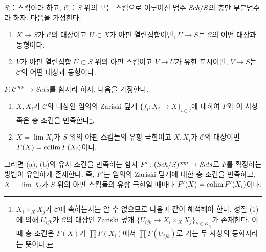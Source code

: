 \begin{lemma}
\label{lemma-extend}
$S$를 스킴이라 하고, $\mathcal{C}$를 $S$ 위의 모든 스킴으로 이루어진 범주
$\mathit{Sch}/S$의 충만 부분범주라 하자. 다음을 가정한다.
\begin{enumerate}
\item $X \to S$가 $\mathcal{C}$의 대상이고 $U \subset X$가 아핀
열린집합이면, $U \to S$는 $\mathcal{C}$의 어떤 대상과 동형이다.
\item $V$가 아핀 열린집합 $U \subset S$ 위의 아핀 스킴이고 $V \to U$가
유한 표시이면, $V \to S$는 $\mathcal{C}$의 어떤 대상과 동형이다.
\end{enumerate}
$F : \mathcal{C}^{opp} \to \textit{Sets}$를 함자라 하자. 다음을 가정한다.
\begin{enumerate}
\item[(a)] $X, X_i$가 $\mathcal{C}$의 대상인 임의의 Zariski 덮개
$\{f_i : X_i \to X\}_{i \in I}$에 대하여 $F$와 이 사상족은 층 조건을
만족한다\footnote{$X_i \times_X X_j$가 $\mathcal{C}$에 속하는지는 알 수
없으므로 다음과 같이 해석해야 한다. 성질 (1)에 의해 $U_{ijk}$가
$\mathcal{C}$의 대상인 Zariski 덮개
$\{U_{ijk} \to X_i \times_X X_j\}_{k \in K_{ij}}$가 존재한다. 이때 층
조건은 $F(X)$가 $\prod F(X_i)$에서 $\prod F(U_{ijk})$로 가는 두 사상의
등화자라는 뜻이다.}.
\item[(b)] $X = \lim X_i$가 $S$ 위의 아핀 스킴들의 유향 극한이고
$X, X_i$가 $\mathcal{C}$의 대상이면 $F(X) = \mathop{\mathrm{colim}}\nolimits F(X_i)$이다.
\end{enumerate}
그러면 (a), (b)의 유사 조건을 만족하는 함자
$F' : (\mathit{Sch}/S)^{opp} \to \textit{Sets}$로 $F$를 확장하는 방법이 유일하게
존재한다. 즉, $F'$는 임의의 Zariski 덮개에 대한 층 조건을 만족하고,
$X = \lim X_i$가 $S$ 위의 아핀 스킴들의 유향 극한일 때마다
$F'(X) = \mathop{\mathrm{colim}}\nolimits F'(X_i)$이다.
\end{lemma}

